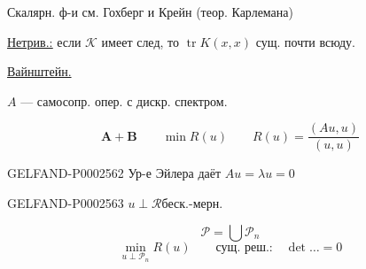 Скалярн. ф-и см. Гохберг и Крейн (теор. Карлемана)





\underline{\underline{Нетрив.:}} если $\mathcal K$ имеет след, то $\operatorname{tr}K(x,x)$ сущ. почти всюду.





\underline{Вайнштейн.}





$A$ — самосопр. опер. с дискр. спектром.





\begin{equation*}
\mathbf{A+B}\qquad\min R(u)\qquad R(u)=\frac{(Au,u)}{(u,u)}
\end{equation*}





\begin{GelfandAdjacentEvidence}{GELFAND-P000256}{2}
Ур-е Эйлера даёт $Au=\lambda u=0$

\end{GelfandAdjacentEvidence}


\begin{GelfandAdjacentEvidence}{GELFAND-P000256}{3}
$u\perp\mathcal R$\qquad беск.-мерн.

\end{GelfandAdjacentEvidence}


\begin{equation*}
\mathcal P=\bigcup\mathcal P_n
\end{equation*}
\begin{equation*}
\min_{u\perp\mathcal P_n}R(u)\qquad\text{сущ. реш.:}\quad\det\ldots=0
\end{equation*}





\begin{flushright}
\end{flushright}







